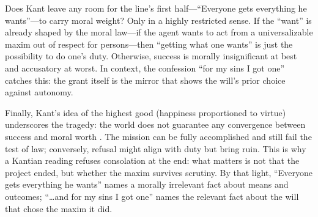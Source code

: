 Does Kant leave any room for the line's first half—``Everyone gets everything he wants''—to
carry moral weight? Only in a highly restricted sense. If the ``want'' is already shaped by
the moral law—if the agent wants to act from a universalizable maxim out of respect for
persons—then ``getting what one wants'' is just the possibility to do one's duty. Otherwise,
success is morally insignificant at best and accusatory at worst. In context, the confession
``for my sins I got one'' catches this: the grant itself is the mirror that shows the will's
prior choice against autonomy.

Finally, Kant's idea of the highest good (happiness proportioned to virtue) underscores the
tragedy: the world does not guarantee any convergence between success and moral worth
\parencite[pp.~125--131]{KantCPrR1996}. The mission can be fully accomplished and still fail
the test of law; conversely, refusal might align with duty but bring ruin. This is why a
Kantian reading refuses consolation at the end: what matters is not that the project ended,
but whether the maxim survives scrutiny. By that light, ``Everyone gets everything he wants''
names a morally irrelevant fact about means and outcomes; ``\ldots and for my sins I got one''
names the relevant fact about the will that chose the maxim it did.
